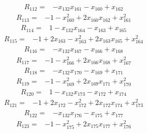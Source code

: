{\begin{align*}
\end{align*}
\begin{align*}
R_{112} ={}& -x_{132} x_{161} - x_{160} + x_{162}
\end{align*}
\begin{align*}
R_{113} ={}& -1 - x_{160}^{2} + 2x_{160} x_{162} + x_{161}^{2}
\end{align*}
\begin{align*}
R_{114} ={}& 1 - x_{132} x_{164} - x_{163} + x_{165}
\end{align*}
\begin{align*}
R_{115} ={}& -1 + 2x_{163} - x_{163}^{2} + 2x_{163} x_{165} + x_{164}^{2}
\end{align*}
\begin{align*}
R_{116} ={}& -x_{132} x_{167} - x_{166} + x_{168}
\end{align*}
\begin{align*}
R_{117} ={}& -1 - x_{166}^{2} + 2x_{166} x_{168} + x_{167}^{2}
\end{align*}
\begin{align*}
R_{118} ={}& -x_{132} x_{170} - x_{169} + x_{171}
\end{align*}
\begin{align*}
R_{119} ={}& -1 - x_{169}^{2} + 2x_{169} x_{171} + x_{170}^{2}
\end{align*}
\begin{align*}
R_{120} ={}& 1 - x_{132} x_{173} - x_{172} + x_{174}
\end{align*}
\begin{align*}
R_{121} ={}& -1 + 2x_{172} - x_{172}^{2} + 2x_{172} x_{174} + x_{173}^{2}
\end{align*}
\begin{align*}
R_{122} ={}& -x_{132} x_{176} - x_{175} + x_{177}
\end{align*}
\begin{align*}
R_{123} ={}& -1 - x_{175}^{2} + 2x_{175} x_{177} + x_{176}^{2}
\end{align*}
\begin{align*}

\end{align*}}
